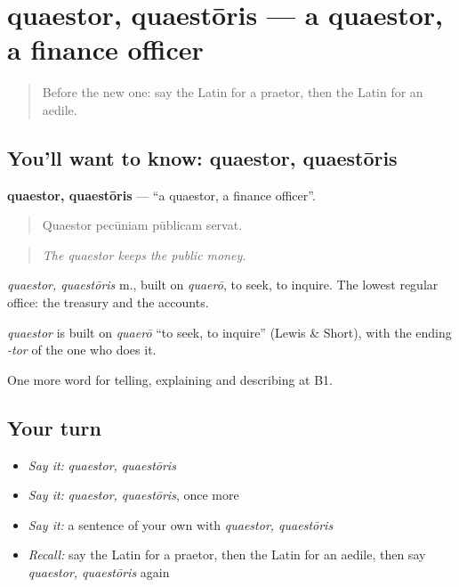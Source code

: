 \section[quaestor, quaestōris]{quaestor, quaestōris — a quaestor, a finance officer}

\label{lesson:LA-C383-quaestor}



\begin{quote}
Before the new one: say the Latin for a praetor, then the Latin for an aedile.
\end{quote}

\subsection*{You'll want to know: quaestor, quaestōris}
\textbf{quaestor, quaestōris} — \textquotedblleft{}a quaestor, a finance officer\textquotedblright{}.

\begin{quote}
Quaestor pecūniam pūblicam servat.
\end{quote}

\begin{quote}
\emph{The quaestor keeps the public money.}
\end{quote}

\emph{quaestor, quaestōris} m., built on \emph{quaerō}, to seek, to inquire. The lowest regular office: the treasury and the accounts.

\begin{cousinweb}
\emph{quaestor} is built on \emph{quaerō} \textquotedblleft{}to seek, to inquire\textquotedblright{} (Lewis \& Short), with the ending \emph{-tor} of the one who does it.
\end{cousinweb}

\begin{grammarlens}[title={What you've built}]
One more word for telling, explaining and describing at B1.
\end{grammarlens}

\subsection*{Your turn}
\begin{itemize}
\raggedright
  \item \emph{Say it:} \emph{quaestor, quaestōris}
  \item \emph{Say it:} \emph{quaestor, quaestōris}, once more
  \item \emph{Say it:} a sentence of your own with \emph{quaestor, quaestōris}
  \item \emph{Recall:} say the Latin for a praetor, then the Latin for an aedile, then say \emph{quaestor, quaestōris} again
\end{itemize}

